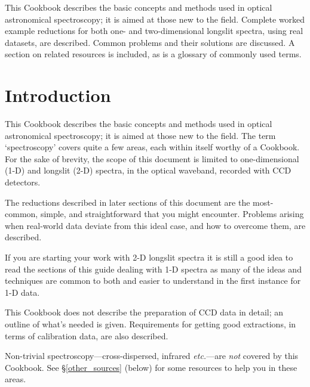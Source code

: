 \documentclass[twoside,11pt]{article}
\newcommand{\stardocinitials}  {SC}
\newcommand{\stardocnumber}    {7.2}
\newcommand{\stardocabstract}  {

This Cookbook describes the basic concepts and methods used in optical
astronomical spectroscopy; it is aimed at those new to the field.
Complete worked example reductions for both one- and two-dimensional
longslit spectra, using real datasets, are described.  Common problems and
their solutions are discussed.  A section on related resources is
included, as is a glossary of commonly used terms.  }
\newcommand{\stardocname}{\stardocinitials /\stardocnumber}
\newenvironment{latexonly}{}{}
\newcommand{\htmlref}[2]{#1}
\newcommand{\xlabel}[1]{}
\newcommand{\mlabel}[1]{\xlabel{#1}\label{#1}}
\newcommand{\scspec}[2]{#1}
\newcommand{\scspec}[2]{#2}
\renewcommand{\thepage}{\roman{page}}
\begin{document}
\stardocabstract
\newpage
\begin{latexonly}
   \setlength{\parskip}{0mm}
   \tableofcontents
   \setlength{\parskip}{\medskipamount}
   \markright{\stardocname}
\end{latexonly}
\cleardoublepage
\renewcommand{\thepage}{\arabic{page}}
\setcounter{page}{1}


\section{\mlabel{introduction}Introduction}
\markboth{Introduction}{\stardocname}

This Cookbook describes the basic concepts and methods used in optical
astronomical spectroscopy; it is aimed at those new to the field.
The term `spectroscopy' covers quite a few areas, each within itself
worthy of a Cookbook.
For the sake of brevity, the scope of this document is limited to
one-dimensional (1-D) and longslit (2-D) spectra, in the optical
waveband, recorded with \htmlref{CCD}{gl_ccd} detectors.

The reductions described in later sections of this document are the
most-common, simple, and straightforward that you might encounter.
Problems arising when real-world data deviate from this ideal case,
and how to overcome them, are described.

If you are starting your work with 2-D longslit spectra it is still a
good idea to read the sections of this guide dealing with 1-D spectra
as many of the ideas and techniques are common to both and easier to
understand in the first instance for 1-D data.

This Cookbook does not describe the preparation of CCD data in detail;
an outline of what's needed is given.  Requirements for getting good
extractions, in terms of calibration data, are also described.

Non-trivial spectroscopy\scspec{---}{ - }cross-dispersed, infrared
{\it{etc.}}\scspec{---}{ - }are {\em not} covered by this Cookbook.
See \scspec{\S\ref{other_sources} (below)}{\htmlref{Other Sources of
Information}{other_sources}} for some resources to help you in these
areas.
\end{document}
